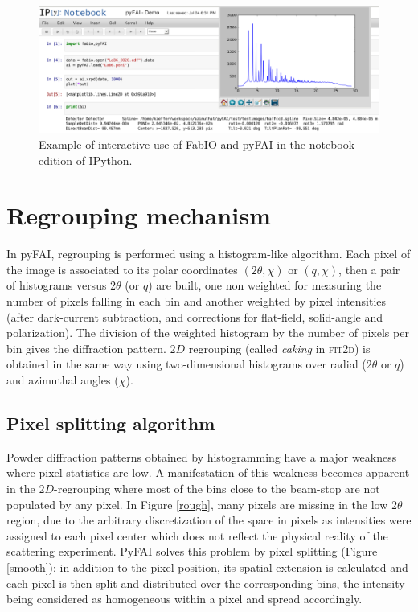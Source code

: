 \documentclass[a4paper]{jpconf}
\begin{document}
\begin{figure}[h]
\begin{center}
\includegraphics[width=15cm]{img/notebook-l.eps}
\caption{\label{notebook} Example of interactive use of FabIO and pyFAI in the
notebook edition of IPython.}
\end{center}
\end{figure}

\section{Regrouping mechanism}
In pyFAI, regrouping is performed using a histogram-like algorithm.
Each pixel of the image is associated to its polar coordinates
$(2\theta , \chi )$ or $(q, \chi )$, then a pair of histograms versus
$2\theta$ (or $q$) are built, one non weighted for measuring the number of
pixels falling in each bin and another weighted by pixel intensities (after
dark-current subtraction, and corrections for flat-field,
solid-angle and polarization).
The division of the weighted histogram by the number of pixels per bin gives
the diffraction pattern.
$2D$ regrouping (called \textit{caking} in \textsc{fit2d}) is obtained in the
same way using two-dimensional histograms over radial ($2\theta$ or $q$) and azimuthal angles
($\chi$).

\subsection{Pixel splitting algorithm}
Powder diffraction patterns obtained by histogramming have a major weakness where
pixel statistics are low.
A manifestation of this weakness becomes apparent in the $2D$-regrouping where
most of the bins close to the beam-stop are not populated by any pixel.
In Figure \ref{rough}, many pixels are missing in the low $2\theta$ region, due
to the arbitrary discretization of the space in pixels as intensities were
assigned to each pixel center which does not reflect the physical reality of the
scattering experiment.
PyFAI solves this problem by pixel splitting (Figure \ref{smooth}): in
addition to the pixel position, its spatial extension is calculated and each
pixel is then split and distributed over the corresponding bins, the intensity
being considered as homogeneous within a pixel and spread accordingly.
\end{document}
